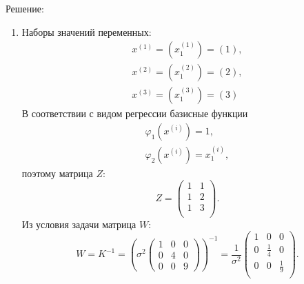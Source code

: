 \documentclass[a4paper,12pt]{article}
\newcommand{\solution}{Решение:\par}
\begin{document}
\solution

\begin{enumerate}
    \item
          Наборы значений переменных:
          \begin{gather*}
              x^{(1)} = ( x_1^{(1)}) = ( 1 ) , \\
              x^{(2)} = ( x_1^{(2)}) = ( 2 ) , \\
              x^{(3)} = ( x_1^{(3)}) = ( 3 )
          \end{gather*}
          В соответствии с видом регрессии базисные функции
          \begin{gather*}
              \varphi_1(x^{(i)}) = 1 , \\
              \varphi_2(x^{(i)}) = x_1^{(i)} ,
          \end{gather*}
          поэтому матрица $Z$:
          \[
              Z
              = \begin{pmatrix}
                  1 & 1 \\
                  1 & 2 \\
                  1 & 3 \\
              \end{pmatrix} .
          \]
          Из условия задачи матрица $W$:
          \[
              W
              = K^{-1}
              = \left(
              \sigma^2
              \begin{pmatrix}
                  1 & 0 & 0 \\
                  0 & 4 & 0 \\
                  0 & 0 & 9
              \end{pmatrix}
              \right)^{-1}
              = \frac{1}{\sigma^2}
              \begin{pmatrix}
                  1 & 0           & 0           \\
                  0 & \frac{1}{4} & 0           \\
                  0 & 0           & \frac{1}{9} \\
              \end{pmatrix} .
          \]


\end{enumerate}
\end{document}
